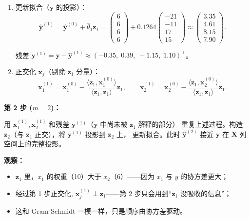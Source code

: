 \begin{enumerate}[label=(\alph*), leftmargin=*]
    \item 更新拟合（$\mathbf{y}$ 的投影）：
    \[
        \hat{\mathbf{y}}^{(1)} = \hat{\mathbf{y}}^{(0)} + \hat{\theta}_1 \mathbf{z}_1
        = \begin{pmatrix} 6 \\ 6 \\ 6 \\ 6 \end{pmatrix}
        + 0.1264 \begin{pmatrix} -21 \\ -11 \\ 17 \\ 15 \end{pmatrix}
        \approx \begin{pmatrix} 3.35 \\ 4.61 \\ 8.15 \\ 7.90 \end{pmatrix}.
    \]
    
    残差 $\mathbf{y}^{(1)} = \mathbf{y} - \hat{\mathbf{y}}^{(1)} \approx ( -0.35,\; 0.39,\; -1.15,\; 1.10)^\top$。
    
    \item 正交化 $\mathbf{x}_j$（剔除 $\mathbf{z}_1$ 分量）：
    \[
        \mathbf{x}_1^{(1)} = \mathbf{x}_1^{(0)} - \frac{\langle \mathbf{z}_1, \mathbf{x}_1^{(0)} \rangle}{\langle \mathbf{z}_1, \mathbf{z}_1 \rangle} \mathbf{z}_1,
        \qquad
        \mathbf{x}_2^{(1)} = \mathbf{x}_2^{(0)} - \frac{\langle \mathbf{z}_1, \mathbf{x}_2^{(0)} \rangle}{\langle \mathbf{z}_1, \mathbf{z}_1 \rangle} \mathbf{z}_1.
    \]
\end{enumerate}

\medskip
\noindent
\textbf{第 2 步 ($m=2$)：}

用 $\mathbf{x}_1^{(1)}, \mathbf{x}_2^{(1)}$ 和残差 $\mathbf{y}^{(1)}$（$\mathbf{y}$ 中尚未被 $\mathbf{z}_1$ 解释的部分）
重复上述过程。构造 $\mathbf{z}_2$（与 $\mathbf{z}_1$ 正交），将 $\mathbf{y}^{(1)}$ 投影到 $\mathbf{z}_2$ 上，
更新拟合。此时 $\hat{\mathbf{y}}^{(2)}$ 接近 $\mathbf{y}$ 在 $\mathbf{X}$ 列空间上的完整投影。

\medskip
\noindent
\textbf{观察：}
\begin{itemize}
    \item $\mathbf{z}_1$ 里，$x_1$ 的权重（10）大于 $x_2$（6）——因为 $x_1$ 与 $y$ 的协方差更大；
    \item 经过第 1 步正交化, $\mathbf{x}_j^{(1)} \perp \mathbf{z}_1$——第 2 步只会用到``$\mathbf{z}_1$ 没吸收的信息''；
    \item 这和 Gram-Schmidt 一模一样，只是顺序由协方差驱动。
\end{itemize}

